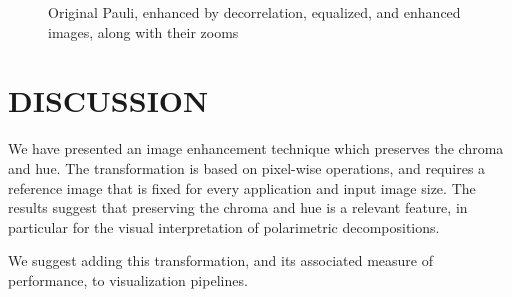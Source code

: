 \documentclass{article}
\begin{document}
\begin{figure}[hbt]
\caption{Original Pauli, enhanced by decorrelation, equalized, and enhanced images, along with their zooms}\label{Fig:Images}
\end{figure}

\section{DISCUSSION}
\label{sec:typestyle}
We have presented an image enhancement technique which preserves the chroma and hue.
The transformation is based on pixel-wise operations, and requires a reference image that is fixed for every application and input image size.
The results suggest that preserving the chroma and hue is a relevant feature, in particular for the visual interpretation of polarimetric decompositions.

We suggest adding this transformation, and its associated measure of performance, to visualization pipelines.



\end{document}
